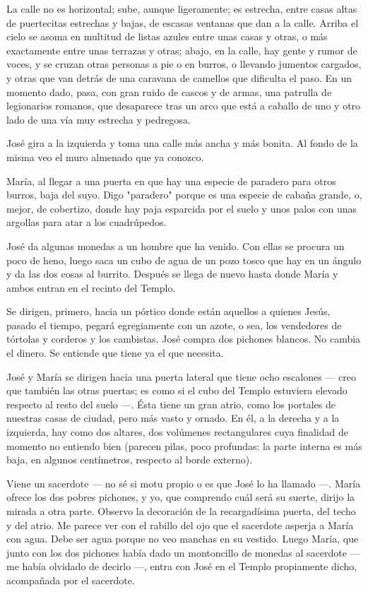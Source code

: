 \documentclass[12pt]{book} %
\begin{document}
La calle no es horizontal; sube, aunque ligeramente; es estrecha, entre casas altas de puertecitas estrechas y bajas, de escasas ventanas que dan a la calle. Arriba el cielo se asoma en multitud de listas azules entre unas casas y otras, o más exactamente entre unas terrazas y otras; abajo, en la calle, hay gente y rumor de voces, y se cruzan otras personas a pie o en burros, o llevando jumentos cargados, y otras que van detrás de una caravana de camellos que dificulta el paso. En un momento dado, pasa, con gran ruido de cascos y de armas, una patrulla de legionarios romanos, que desaparece tras un arco que está a caballo de uno y otro lado de una vía muy estrecha y pedregosa. 

José gira a la izquierda y toma una calle más ancha y más bonita. Al fondo de la misma veo el muro almenado que ya conozco. 

María, al llegar a una puerta en que hay una especie de paradero para otros burros, baja del suyo. Digo "paradero" porque es una especie de cabaña grande, o, mejor, de cobertizo, donde hay paja esparcida por el suelo y unos palos con unas argollas para atar a los cuadrúpedos. 

José da algunas monedas a un hombre que ha venido. Con ellas se procura un poco de heno, luego saca un cubo de agua de un pozo tosco que hay en un ángulo y da las dos cosas al burrito. Después se llega de nuevo hasta donde María y ambos entran en el recinto del Templo. 

Se dirigen, primero, hacia un pórtico donde están aquellos a quienes Jesús, pasado el tiempo, pegará egregiamente con un azote, o sea, los vendedores de tórtolas y corderos y los cambistas. José compra dos pichones blancos. No cambia el dinero. Se entiende que tiene ya el que necesita. 

José y María se dirigen hacia una puerta lateral que tiene ocho escalones — creo que también las otras puertas; es como si el cubo del Templo estuviera elevado respecto al resto del suelo —. Ésta tiene un gran atrio, como los portales de nuestras casas de ciudad, pero más vasto y ornado. En él, a la derecha y a la izquierda, hay como dos altares, dos volúmenes rectangulares cuya finalidad de momento no entiendo bien (parecen pilas, poco profundas: la parte interna es más baja, en algunos centímetros, respecto al borde externo). 

Viene un sacerdote — no sé si motu propio o es que José lo ha llamado —. María ofrece los dos pobres pichones, y yo, que comprendo cuál será su suerte, dirijo la mirada a otra parte. Observo la decoración de la recargadísima puerta, del techo y del atrio. Me parece ver con el rabillo del ojo que el sacerdote asperja a María con agua. Debe ser agua porque no veo manchas en su vestido. Luego María, que junto con los dos pichones había dado un montoncillo de monedas al sacerdote — me había olvidado de decirlo —, entra con José en el Templo propiamente dicho, acompañada por el sacerdote. 
\end{document}
